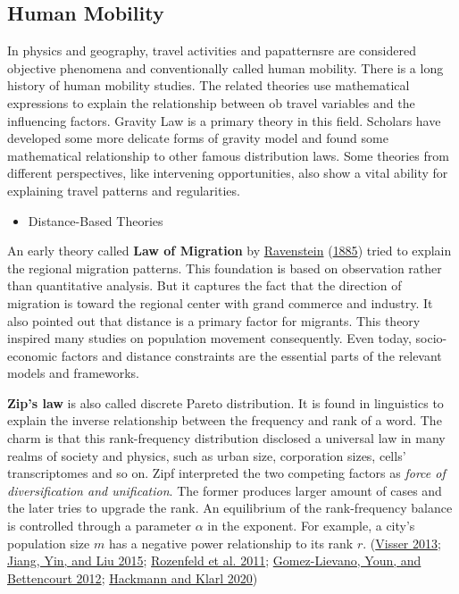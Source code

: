 \documentclass[
  12pt,
]{article}
\providecommand{\tightlist}{%
  \setlength{\itemsep}{0pt}\setlength{\parskip}{0pt}}
\begin{document}
\hypertarget{human-mobility}{%
\subsection{Human Mobility}\label{human-mobility}}

In physics and geography, travel activities and papatternsre are considered objective phenomena and conventionally called human mobility. There is a long history of human mobility studies. The related theories use mathematical expressions to explain the relationship between ob travel variables and the influencing factors. Gravity Law is a primary theory in this field. Scholars have developed some more delicate forms of gravity model and found some mathematical relationship to other famous distribution laws. Some theories from different perspectives, like intervening opportunities, also show a vital ability for explaining travel patterns and regularities.

\begin{itemize}
\tightlist
\item
  Distance-Based Theories
\end{itemize}

An early theory called \textbf{Law of Migration} by \protect\hyperlink{ref-ravensteinLawsMigration1885}{Ravenstein} (\protect\hyperlink{ref-ravensteinLawsMigration1885}{1885}) tried to explain the regional migration patterns. This foundation is based on observation rather than quantitative analysis. But it captures the fact that the direction of migration is toward the regional center with grand commerce and industry. It also pointed out that distance is a primary factor for migrants. This theory inspired many studies on population movement consequently. Even today, socio-economic factors and distance constraints are the essential parts of the relevant models and frameworks.

\textbf{Zip's law} is also called discrete Pareto distribution. It is found in linguistics to explain the inverse relationship between the frequency and rank of a word. The charm is that this rank-frequency distribution disclosed a universal law in many realms of society and physics, such as urban size, corporation sizes, cells' transcriptomes and so on. Zipf interpreted the two competing factors as \emph{force of diversification and unification}. The former produces larger amount of cases and the later tries to upgrade the rank. An equilibrium of the rank-frequency balance is controlled through a parameter \(\alpha\) in the exponent. For example, a city's population size \(m\) has a negative power relationship to its rank \(r\). (\protect\hyperlink{ref-visserZipfLawPower2013}{Visser 2013}; \protect\hyperlink{ref-jiangZipfLawAll2015}{Jiang, Yin, and Liu 2015}; \protect\hyperlink{ref-rozenfeldAreaPopulationCities2011}{Rozenfeld et al. 2011}; \protect\hyperlink{ref-gomez-lievanoStatisticsUrbanScaling2012}{Gomez-Lievano, Youn, and Bettencourt 2012}; \protect\hyperlink{ref-hackmannEvolutionZipfLaw2020}{Hackmann and Klarl 2020})
\end{document}
